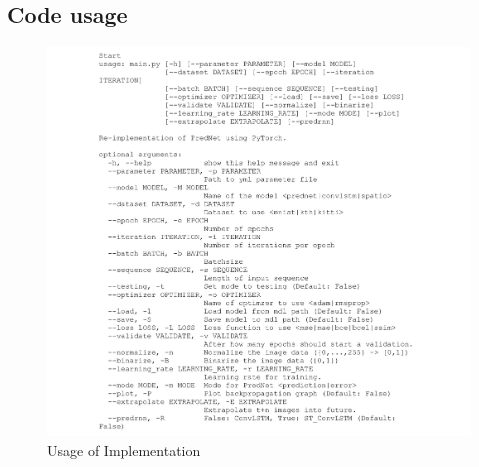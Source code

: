  \subsection*{Code usage}
  \begin{figure}[H]
   \includegraphics[width=1.0\textwidth]{../Images/usage.png}
   \centering
   \caption{Usage of Implementation}
   \label{fig:tree}
  \end{figure}\noindent
 \newpage 
